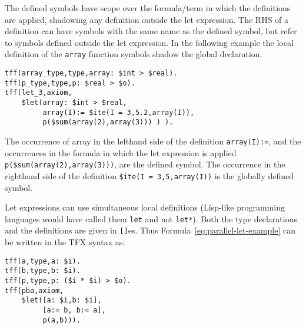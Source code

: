 \documentclass{easychair}
\begin{document}
The defined symbols have scope over the formula/term in which the definitions 
are applied, shadowing any definition outside the let expression. 
The RHS of a definition can have symbols with the same name as the defined 
symbol, but refer to symbols defined outside the let expression. In the following example the local definition of the {\tt array} function symbols shadow the global declaration.
\begin{verbatim}
tff(array_type,type,array: $int > $real).
tff(p_type,type,p: $real > $o).
tff(let_3,axiom,
    $let(array: $int > $real,
         array(I):= $ite(I = 3,5.2,array(I)),
         p($sum(array(2),array(3))) ) ).
\end{verbatim}

The occurrence of array in the lefthand side of the definition 
{\tt array(I):=}, and the occurrences in the formula in which the let 
expression is applied {\tt p(\$sum(array(2),array(3)))}, are the defined 
symbol. 
The occurrence in the righthand side of the definition 
{\tt \$ite(I = 3,5,array(I))} is the globally defined symbol.

Let expressions can use simultaneous local definitions
(Lisp-like programming languages would have called them \verb'let' and not \verb'let*').
Both the type declarations and the definitions are given in {\tt []}es. 
Thus Formula~\ref{eq:parallel-let-example} can be written in the TFX syntax as:
\begin{verbatim}
tff(a,type,a: $i).
tff(b,type,b: $i).
tff(p,type,p: ($i * $i) > $o).
tff(pba,axiom,
    $let([a: $i,b: $i],
         [a:= b, b:= a],
         p(a,b))).
\end{verbatim}
\end{document}
